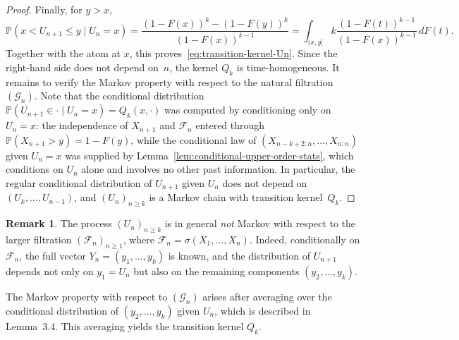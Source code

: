 \documentclass[12pt]{article}
\theoremstyle{definition}
\newtheorem{remark}[theorem]{Remark}
\begin{document}
\begin{proof}
Finally, for $y>x$,
\[
\mathbb{P}(x<U_{n+1}\le y\mid U_n=x)
=
\frac{(1-F(x))^k-(1-F(y))^k}{(1-F(x))^{k-1}}
=
\int_{(x,y]}
k\frac{(1-F(t))^{k-1}}{(1-F(x))^{k-1}}\,dF(t).
\]
Together with the atom at $x$, this proves~\eqref{eq:transition-kernel-Un}.
Since the right-hand side does not depend on~$n$, the kernel $Q_k$ is
time-homogeneous. It remains to verify the Markov property with respect
to the natural filtration $(\mathcal{G}_n)$.
Note that the conditional distribution
$\mathbb{P}(U_{n+1}\in\cdot\mid U_n=x)=Q_k(x,\cdot)$
was computed by conditioning only on $U_n=x$: the independence of
$X_{n+1}$ and $\mathcal{F}_n$ entered through $\mathbb{P}(X_{n+1}>y)=1-F(y)$,
while the conditional law of
$(X_{n-k+2:n},\dots,X_{n:n})$ given $U_n=x$ was supplied by
Lemma~\ref{lem:conditional-upper-order-stats}, which conditions
on $U_n$ alone and involves no other past information.
In particular, the regular conditional distribution of
$U_{n+1}$ given $U_n$ does not depend on $(U_k,\dots,U_{n-1})$, and
$(U_n)_{n\ge k}$ is a Markov chain with transition kernel~$Q_k$.
\end{proof}

\begin{remark}
\label{rem:kernel-special-case-k1Markov}
The process $(U_n)_{n \ge k}$ is in general \emph{not} Markov with respect to the larger filtration $(\mathcal F_n)_{n \ge 1}$, where $\mathcal F_n = \sigma(X_1,\ldots,X_n)$. Indeed, conditionally on $\mathcal F_n$, the full vector $Y_n=(y_1,\ldots,y_k)$ is known, and the distribution of $U_{n+1}$ depends not only on $y_1 = U_n$ but also on the remaining components $(y_2,\ldots,y_k)$. 

The Markov property with respect to $(\mathcal G_n)$ arises after averaging over the conditional distribution of $(y_2,\ldots,y_k)$ given $U_n$, which is described in Lemma~3.4. This averaging yields the transition kernel $Q_k$.
\end{remark}

%
\end{document}

